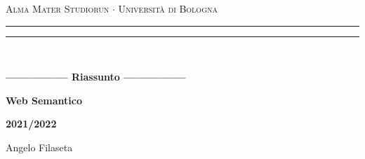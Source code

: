 \begin{titlepage}
    \begin{center}
        {{\Large{\textsc{Alma Mater Studiorun $\cdot$ Università di Bologna}}}}
        \rule[0.1cm]{15.8cm}{0.1mm}
        \rule[0.5cm]{15.8cm}{0.6mm}
        \\
        \vspace{3mm}
    \end{center}
    \vspace{2mm}
    \begin{center}
        {\LARGE{\bf{----------------- Riassunto -----------------}}}
        \vspace{5mm} \par \noindent
        {\Huge{\bf{Web Semantico}}}
        \vspace{10mm} \par \noindent
        {\LARGE \textbf{2021/2022}}
        \vspace{15mm} \par \noindent
        {\Large Angelo Filaseta}
    \end{center}
    \hfill
    \vspace{40mm}
\end{titlepage}
